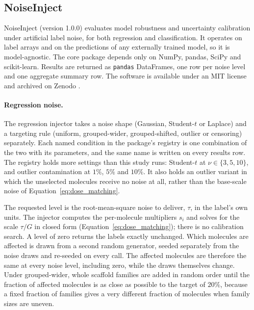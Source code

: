 \subsection{NoiseInject}\label{sec:noiseinject_pkg} %

NoiseInject (version 1.0.0) evaluates model robustness and uncertainty calibration under artificial
label noise, for both regression and classification. It operates on label arrays and on the
predictions of any externally trained model, so it is model-agnostic. The core package depends only
on NumPy, pandas, SciPy and scikit-learn. Results are returned as \texttt{pandas} DataFrames, one
row per noise level and one aggregate summary row. The software is available under an MIT license
and archived on Zenodo \citep{noiseinject}.

\paragraph{Regression noise.} The regression injector takes a noise shape (Gaussian, Student-$t$ or
Laplace) and a targeting rule (uniform, grouped-wider, grouped-shifted, outlier or censoring)
separately. Each named condition in the package's registry is one combination of the two with its
parameters, and the same name is written on every results row. The registry holds more settings
than this study runs: Student-$t$ at $\nu \in \{3, 5, 10\}$, and outlier contamination at $1\%$,
$5\%$ and $10\%$. It also holds an outlier variant in which the unselected molecules receive no
noise at all, rather than the base-scale noise of Equation~\ref{eq:dose_matching}.

The requested level is the root-mean-square noise to deliver, $\tau$, in the label's own units. The
injector computes the per-molecule multipliers $s_i$ and solves for the scale $\tau / G$ in closed
form (Equation~\ref{eq:dose_matching}); there is no calibration search. A level of zero returns the
labels exactly unchanged. Which molecules are affected is drawn from a second random generator,
seeded separately from the noise draws and re-seeded on every call. The affected molecules are
therefore the same at every noise level, including zero, while the draws themselves change. Under
grouped-wider, whole scaffold families are added in random order until the fraction of affected
molecules is as close as possible to the target of $20\%$, because a fixed fraction of families
gives a very different fraction of molecules when family sizes are uneven.

